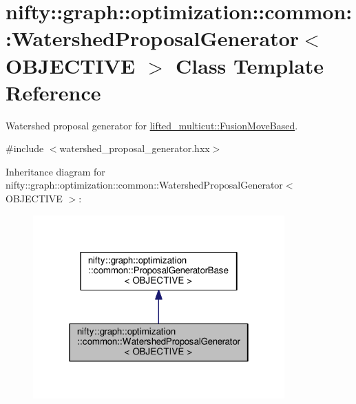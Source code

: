 \hypertarget{classnifty_1_1graph_1_1optimization_1_1common_1_1WatershedProposalGenerator}{}\section{nifty\+:\+:graph\+:\+:optimization\+:\+:common\+:\+:Watershed\+Proposal\+Generator$<$ O\+B\+J\+E\+C\+T\+I\+V\+E $>$ Class Template Reference}
\label{classnifty_1_1graph_1_1optimization_1_1common_1_1WatershedProposalGenerator}


Watershed proposal generator for \hyperlink{classnifty_1_1graph_1_1optimization_1_1lifted__multicut_1_1FusionMoveBased}{lifted\+\_\+multicut\+::\+Fusion\+Move\+Based}.  




{\ttfamily \#include $<$watershed\+\_\+proposal\+\_\+generator.\+hxx$>$}



Inheritance diagram for nifty\+:\+:graph\+:\+:optimization\+:\+:common\+:\+:Watershed\+Proposal\+Generator$<$ O\+B\+J\+E\+C\+T\+I\+V\+E $>$\+:\nopagebreak
\begin{figure}[H]
\begin{center}
\leavevmode
\includegraphics[width=274pt]{classnifty_1_1graph_1_1optimization_1_1common_1_1WatershedProposalGenerator__inherit__graph}
\end{center}
\end{figure}


